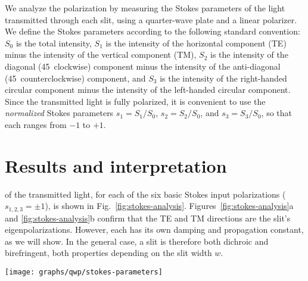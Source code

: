We analyze the polarization by measuring the Stokes parameters of the light transmitted through each slit, using a quarter-wave plate and a linear polarizer.
We define the Stokes parameters according to the following standard convention:
%
$S_0$ is the total intensity,
$S_1$ is the intensity of the horizontal component (\gls{TE}) minus the intensity of the vertical component (\gls{TM}),
$S_2$ is the intensity of the diagonal (45\textdegree\ clockwise) component minus the intensity of the anti-diagonal (45\textdegree\ counterclockwise) component,
and $S_3$ is the intensity of the right-handed circular component minus the intensity of the left-handed circular component.
Since the transmitted light is fully polarized, it is convenient to use the \emph{normalized} Stokes parameters $s_1 = S_1/S_0$, $s_2 = S_2/S_0$, and $s_3 = S_3/S_0$, so that each ranges from $-1$ to $+1$.

\section{Results and interpretation}

 of the transmitted light, for each of the six basic Stokes input polarizations ($s_{1, 2, 3} = \pm 1$), is shown in Fig.~\ref{fig:stokes-analysis}.
Figures~\ref{fig:stokes-analysis}a and \ref{fig:stokes-analysis}b confirm that the \gls{TE} and \gls{TM} directions are the slit's eigenpolarizations.
However, each has its own damping and propagation constant, as we will show.
In the general case, a slit is therefore both dichroic and birefringent, both properties depending on the slit width $w$.
%
\begin{figure*}[tb]
\centering\texttt{[image: graphs/qwp/stokes-parameters]}
\caption{Normalized Stokes parameters of the light transmitted through the slit, for illumination with
(a) horizontal linear polarization ($s_1=+1$),
(b) vertical linear polarization ($s_1=-1$),
(c) diagonal linear polarization ($s_2=+1$),
(d) antidiagonal linear polarization ($s_2=-1$),
(e) left-handed circular polarization ($s_3=+1$), and
(f) right-handed circular polarization ($s_3=-1$).
The polarization ellipses above each graph provide a quick visual indication of the polarization state of the transmitted light.
The solid lines represent the results of our model, described later on in section~\ref{qwp:sec:waveguide-model}, based on simple waveguide theory.
}
\label{fig:stokes-analysis}
\end{figure*}
%
%

